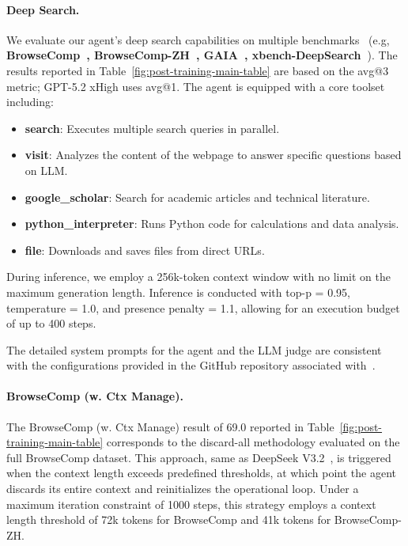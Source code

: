 \paragraph{Deep Search.}

We evaluate our agent's deep search capabilities on multiple benchmarks \ (e.g, \textbf{BrowseComp~\cite{wei2025browsecomp}, BrowseComp-ZH~\cite{zhou2025browsecompzhbenchmarkingwebbrowsing}, GAIA~\cite{mialon2023gaiabenchmarkgeneralai}, xbench-DeepSearch~\cite{chen2025xbench}}). The results reported in Table~\ref{fig:post-training-main-table} are based on the avg@3 metric; GPT-5.2 xHigh uses avg@1. The agent is equipped with a core toolset including:
\begin{itemize}
    \item \textbf{search}: Executes multiple search queries in parallel.
    \item \textbf{visit}: Analyzes the content of the webpage to answer specific questions based on LLM.
    \item \textbf{google\_scholar}: Search for academic articles and technical literature.
    \item \textbf{python\_interpreter}: Runs Python code for calculations and data analysis.
     \item \textbf{file}: Downloads and saves files from direct URLs.
\end{itemize}

During inference, we employ a 256k-token context window with no limit on the maximum generation length. Inference is conducted with top-p = 0.95, temperature = 1.0, and presence penalty = 1.1, allowing for an execution budget of up to 400 steps.

The detailed system prompts for the agent and the LLM judge are consistent with the configurations provided in the GitHub repository associated with~\cite{hu2025stepdeepresearchtechnicalreport}.

\paragraph{BrowseComp (w. Ctx Manage).}

The BrowseComp (w. Ctx Manage) result of 69.0 reported in Table~\ref{fig:post-training-main-table} corresponds to the discard-all methodology evaluated on the full BrowseComp dataset. This approach, same as DeepSeek V3.2~\cite{deepseekai2024deepseekv32}, is triggered when the context length exceeds predefined thresholds, at which point the agent discards its entire context and reinitializes the operational loop. Under a maximum iteration constraint of 1000 steps, this strategy employs a context length threshold of 72k tokens for BrowseComp and 41k tokens for BrowseComp-ZH.

